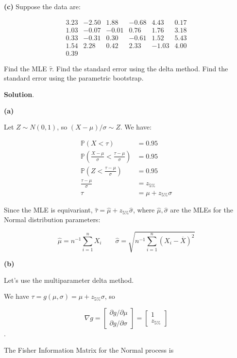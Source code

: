 \textbf{(c)} Suppose the data are:

\[
\begin{matrix}
3.23 & -2.50 &  1.88 & -0.68 &  4.43 & 0.17 \\ 
1.03 & -0.07 & -0.01 &  0.76 &  1.76 & 3.18 \\
0.33 & -0.31 &  0.30 & -0.61 &  1.52 & 5.43 \\
1.54 &  2.28 &  0.42 &  2.33 & -1.03 & 4.00 \\
0.39 
\end{matrix}
\]

Find the MLE \(\hat{\tau}\). Find the standard error using the delta
method. Find the standard error using the parametric bootstrap.

\textbf{Solution}.

\textbf{(a)}

Let \(Z \sim N(0, 1)\), so \((X - \mu) / \sigma \sim Z\). We have:

\begin{align}
\mathbb{P}(X < \tau) &= 0.95 \\
\mathbb{P}\left(\frac{X - \mu}{\sigma} < \frac{\tau - \mu}{\sigma}\right) &= 0.95 \\
\mathbb{P}\left(Z < \frac{\tau - \mu}{\sigma}\right) &= 0.95 \\
\frac{\tau - \mu}{\sigma} &= z_{5\%} \\
\tau &= \mu + z_{5\%} \sigma 
\end{align}

Since the MLE is equivariant,
\(\hat{\tau} = \hat{\mu} + z_{5\%} \hat{\sigma}\), where
\(\hat{\mu}, \hat{\sigma}\) are the MLEs for the Normal distribution
parameters:

\[ \hat{\mu} = n^{-1} \sum_{i=1}^n X_i
\quad \quad
\hat{\sigma} = \sqrt{n^{-1} \sum_{i=1}^n (X_i - \overline{X})^2}
\]

\textbf{(b)}

Let's use the multiparameter delta method.

We have \(\tau = g(\mu, \sigma) = \mu + z_{5\%} \sigma\), so

\[ \nabla g = \begin{bmatrix}
\partial g / \partial \mu \\
\partial g / \partial \sigma
\end{bmatrix}
= \begin{bmatrix}
1 \\
z_{5\%}
\end{bmatrix}\].

The Fisher Information Matrix for the Normal process is

